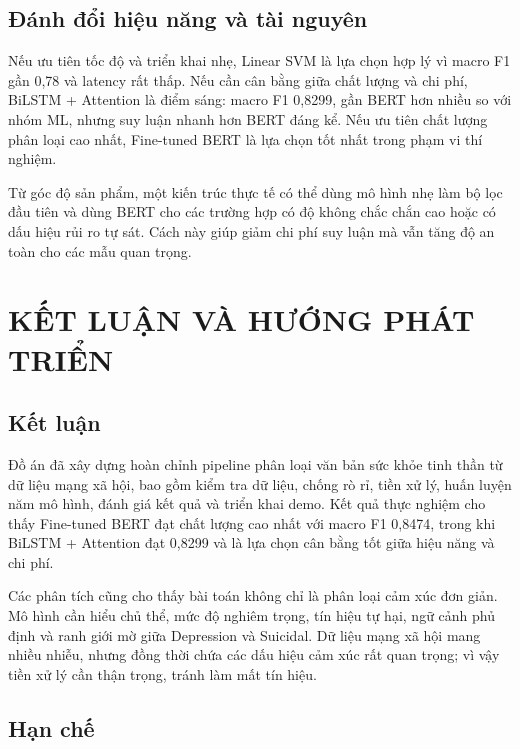 \documentclass[12pt,a4paper,oneside]{report}
\newlength{\manualparindent}
\newcommand{\manualindent}{\hspace*{\manualparindent}}
\begin{document}
\section{Đánh đổi hiệu năng và tài nguyên}

\manualindent%
Nếu ưu tiên tốc độ và triển khai nhẹ, Linear SVM là lựa chọn hợp lý vì macro F1 gần 0,78 và latency rất thấp. Nếu cần cân bằng giữa chất lượng và chi phí, BiLSTM + Attention là điểm sáng: macro F1 0,8299, gần BERT hơn nhiều so với nhóm ML, nhưng suy luận nhanh hơn BERT đáng kể. Nếu ưu tiên chất lượng phân loại cao nhất, Fine-tuned BERT là lựa chọn tốt nhất trong phạm vi thí nghiệm.

\manualindent%
Từ góc độ sản phẩm, một kiến trúc thực tế có thể dùng mô hình nhẹ làm bộ lọc đầu tiên và dùng BERT cho các trường hợp có độ không chắc chắn cao hoặc có dấu hiệu rủi ro tự sát. Cách này giúp giảm chi phí suy luận mà vẫn tăng độ an toàn cho các mẫu quan trọng.

\chapter{KẾT LUẬN VÀ HƯỚNG PHÁT TRIỂN}

\section{Kết luận}

\manualindent%
Đồ án đã xây dựng hoàn chỉnh pipeline phân loại văn bản sức khỏe tinh thần từ dữ liệu mạng xã hội, bao gồm kiểm tra dữ liệu, chống rò rỉ, tiền xử lý, huấn luyện năm mô hình, đánh giá kết quả và triển khai demo. Kết quả thực nghiệm cho thấy Fine-tuned BERT đạt chất lượng cao nhất với macro F1 0,8474, trong khi BiLSTM + Attention đạt 0,8299 và là lựa chọn cân bằng tốt giữa hiệu năng và chi phí.

\manualindent%
Các phân tích cũng cho thấy bài toán không chỉ là phân loại cảm xúc đơn giản. Mô hình cần hiểu chủ thể, mức độ nghiêm trọng, tín hiệu tự hại, ngữ cảnh phủ định và ranh giới mờ giữa Depression và Suicidal. Dữ liệu mạng xã hội mang nhiều nhiễu, nhưng đồng thời chứa các dấu hiệu cảm xúc rất quan trọng; vì vậy tiền xử lý cần thận trọng, tránh làm mất tín hiệu.

\section{Hạn chế}
\end{document}
